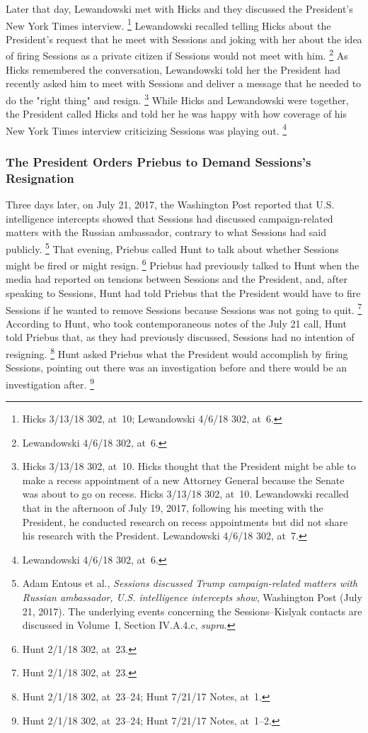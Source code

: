 {Later that day, Lewandowski met with Hicks and they discussed the President's New York Times interview.%
\footnote{Hicks 3/13/18 302, at~10;
Lewandowski 4/6/18 302, at~6.}
Lewandowski recalled telling Hicks about the President's request that he meet with Sessions and joking with her about the idea of firing Sessions as a private citizen if Sessions would not meet with him.%
\footnote{Lewandowski 4/6/18 302, at~6.}
As Hicks remembered the conversation, Lewandowski told her the President had recently asked him to meet with Sessions and deliver a message that he needed to do the "right thing" and resign.%
\footnote{Hicks 3/13/18 302, at~10.
Hicks thought that the President might be able to make a recess appointment of a new Attorney General because the Senate was about to go on recess.
Hicks 3/13/18 302, at~10.
Lewandowski recalled that in the afternoon of July 19, 2017, following his meeting with the President, he conducted research on recess appointments but did not share his research with the President.
Lewandowski 4/6/18 302, at~7.}
While Hicks and Lewandowski were together, the President called Hicks and told her he was happy with how coverage of his New York Times interview criticizing Sessions was playing out.%
\footnote{Lewandowski 4/6/18 302, at~6.}

\subsubsection{The President Orders Priebus to Demand Sessions's Resignation}

Three days later, on July 21, 2017, the Washington Post reported that U.S. intelligence intercepts showed that Sessions had discussed campaign-related matters with the Russian ambassador, contrary to what Sessions had said publicly.%
\footnote{Adam Entous et al., \textit{Sessions discussed Trump campaign-related matters with Russian ambassador, U.S. intelligence intercepts show}, Washington Post (July 21, 2017).
The underlying events concerning the Sessions--Kislyak contacts are discussed in Volume~I, Section IV.A.4.c, \textit{supra}.}
That evening, Priebus called Hunt to talk about whether Sessions might be fired or might resign.%
\footnote{Hunt 2/1/18 302, at~23.}
Priebus had previously talked to Hunt when the media had reported on tensions between Sessions and the President, and, after speaking to Sessions, Hunt had told Priebus that the President would have to fire Sessions if he wanted to remove Sessions because Sessions was not going to quit.%
\footnote{Hunt 2/1/18 302, at~23.}
According to Hunt, who took contemporaneous notes of the July 21 call, Hunt told Priebus that, as they had previously discussed, Sessions had no intention of resigning.%
\footnote{Hunt 2/1/18 302, at~23--24;
Hunt 7/21/17 Notes, at~1.}
Hunt asked Priebus what the President would accomplish by firing Sessions, pointing out there was an investigation before and there would be an investigation after.%
\footnote{Hunt 2/1/18 302, at~23--24;
Hunt 7/21/17 Notes, at~1--2.}

}
